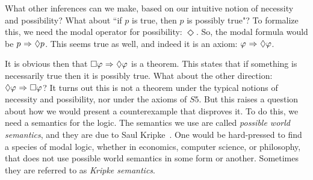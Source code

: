 What other inferences can we make, based on our intuitive notion of necessity and possibility? What about ``if $p$ is true, then $p$ is possibly true"? To formalize this, we need the modal operator for possibility: $\Diamond$. So, the modal formula would be $p {\ \Rightarrow \ } \Diamond p$. This seems true as well, and indeed it is an axiom: $\varphi {\ \Rightarrow \ } \Diamond \varphi$. 

	

It is obvious then that $\Box \varphi {\ \Rightarrow \ } \Diamond \varphi$ is a theorem. This states that if something is necessarily true then it is possibly true. What about the other direction: $\Diamond \varphi {\ \Rightarrow \ } \Box \varphi$? It turns out this is not a theorem under the typical notions of necessity and possibility, nor under the axioms of $\mathit{S5}$. But this raises a question about how we would present a counterexample that disproves it. To do this, we need a semantics for the logic. The semantics we use are called \emph{possible world semantics}, and they are due to Saul Kripke~\cite{Kripke}. One would be hard-pressed to find a species of modal logic, whether in economics, computer science, or philosophy, that does not use possible world semantics in some form or another. Sometimes they are referred to as \emph{Kripke semantics}.


